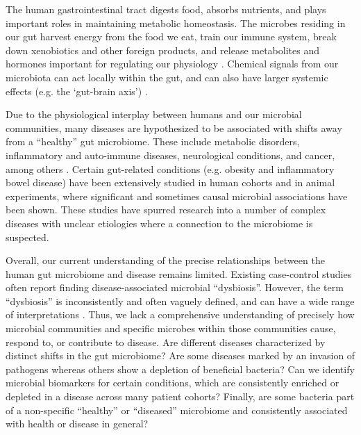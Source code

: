 \documentclass{article}
\begin{document}
The human gastrointestinal tract digests food, absorbs nutrients, and plays important roles in maintaining metabolic homeostasis.
The microbes residing in our gut harvest energy from the food we eat, train our immune system, break down xenobiotics and other foreign products, and release metabolites and hormones important for regulating our physiology \cite{nash-baker, asd-kb, turnbaugh2006obesity}. 
Chemical signals from our microbiota can act locally within the gut, and can also have larger systemic effects (e.g. the `gut-brain axis') \cite{Hsiao2013gutbrain,Cryan2012gutbrain,Poutahidis2013gutbrain}. 

Due to the physiological interplay between humans and our microbial communities, many diseases are hypothesized to be associated with shifts away from a ``healthy'' gut microbiome. 
These include metabolic disorders, inflammatory and auto-immune diseases, neurological conditions, and cancer, among others \cite{nash-baker, turnbaugh2006obesity, asd-son, crc-zhao, par-schep}.
Certain gut-related conditions (e.g. obesity and inflammatory bowel disease) have been extensively studied in human cohorts and in animal experiments, where significant and sometimes causal microbial associations have been shown.
These studies have spurred research into a number of complex diseases with unclear etiologies where a connection to the microbiome is suspected.

Overall, our current understanding of the precise relationships between the human gut microbiome and disease remains limited.
Existing case-control studies often report finding disease-associated microbial ``dysbiosis''. 
However, the term ``dysbiosis'' is inconsistently and often vaguely defined, and can have a wide range of interpretations \cite{olesen2016dysbiosis,zaneveld2017karenina}. 
Thus, we lack a comprehensive understanding of precisely how microbial communities and specific microbes within those communities cause, respond to, or contribute to disease. 
Are different diseases characterized by distinct shifts in the gut microbiome? 
Are some diseases marked by an invasion of pathogens whereas others show a depletion of beneficial bacteria? 
Can we identify microbial biomarkers for certain conditions, which are consistently enriched or depleted in a disease across many patient cohorts? 
Finally, are some bacteria part of a non-specific ``healthy'' or ``diseased'' microbiome and consistently associated with health or disease in general?
\end{document}

